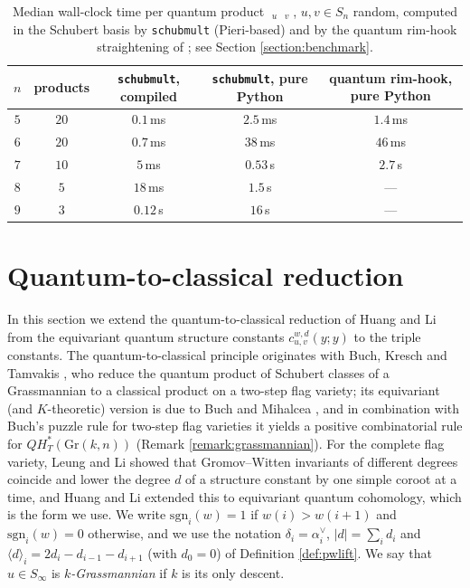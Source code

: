 \documentclass{amsart}
\theoremstyle{definition}
\theoremstyle{remark}
\numberwithin{equation}{section}
\DeclareMathOperator{\qsch}{\widetilde{\mathfrak{S}}}
\begin{document}
\begin{table}[ht]
\begin{center}
\begin{tabular}{c|c|c|c|c}
$n$ & products & \texttt{schubmult}, compiled & \texttt{schubmult}, pure Python & quantum rim-hook, pure Python\\
\hline
$5$ & $20$ & $0.1$\,ms & $2.5$\,ms & $1.4$\,ms\\
$6$ & $20$ & $0.7$\,ms & $38$\,ms & $46$\,ms\\
$7$ & $10$ & $5$\,ms & $0.53$\,s & $2.7$\,s\\
$8$ & $5$ & $18$\,ms & $1.5$\,s & --- \\
$9$ & $3$ & $0.12$\,s & $16$\,s & --- \\
\end{tabular}
\end{center}
\caption{Median wall-clock time per quantum product $\qsch_u\qsch_v$, $u,v\in S_n$ random, computed in the Schubert basis by \texttt{schubmult} (Pieri-based) and by the quantum rim-hook straightening of \cite{gu2020rimhook}; see Section \ref{section:benchmark}.} \label{table:benchmark}
\end{table}

\section{Quantum-to-classical reduction} \label{section:quantclass}

In this section we extend the quantum-to-classical reduction of Huang and Li \cite{huang2015equivariant} from the equivariant quantum structure constants $c_{u,v}^{w,d}(y;y)$ to the triple constants. The quantum-to-classical principle originates with Buch, Kresch and Tamvakis \cite{buch2003gwgrass}, who reduce the quantum product of Schubert classes of a Grassmannian to a classical product on a two-step flag variety; its equivariant (and $K$-theoretic) version is due to Buch and Mihalcea \cite{buch2011qkgrass}, and in combination with Buch's puzzle rule for two-step flag varieties \cite{buch2015mutations} it yields a positive combinatorial rule for $QH_T^*(\mathrm{Gr}(k,n))$ (Remark \ref{remark:grassmannian}). For the complete flag variety, Leung and Li \cite{leung2012classical} showed that Gromov--Witten invariants of different degrees coincide and lower the degree $d$ of a structure constant by one simple coroot at a time, and Huang and Li \cite{huang2015equivariant} extended this to equivariant quantum cohomology, which is the form we use. We write $\mathrm{sgn}_i(w)=1$ if $w(i)>w(i+1)$ and $\mathrm{sgn}_i(w)=0$ otherwise, and we use the notation $\delta_i=\alpha_i^\vee$, $|d|=\sum_id_i$ and $\langle d\rangle_i=2d_i-d_{i-1}-d_{i+1}$ (with $d_0=0$) of Definition \ref{def:pwlift}. We say that $u\in S_\infty$ is \emph{$k$-Grassmannian} if $k$ is its only descent.
\end{document}
